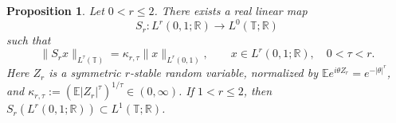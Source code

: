 \documentclass[11pt, reqno]{amsart}
\newtheorem{proposition}[theorem]{Proposition}
\theoremstyle{definition}
\theoremstyle{remark}
\newcommand{\T}{\mathbb{T}}
\newcommand{\R}{\mathbb{R}}
\begin{document}
\begin{proposition}
\label{prop:stable-embed}
Let \(0<r\le2\). There exists a real linear map
\[
        S_r:L^r(0,1;\R)\longrightarrow L^0(\T;\R)
\]
such that
\begin{equation}
\label{eq:stable-moments}
        \|S_rx\|_{L^\tau(\T)}
        =
        \kappa_{r,\tau}\|x\|_{L^r(0,1)},
        \qquad
        x\in L^r(0,1;\R),\quad 0<\tau<r.
\end{equation}
Here \(Z_r\) is a symmetric \(r\)-stable random variable, normalized by
\(\mathbb E e^{i\theta Z_r}=e^{-|\theta|^r}\), and
\(\kappa_{r,\tau}:=(\mathbb E|Z_r|^\tau)^{1/\tau}\in(0,\infty)\).
If \(1<r\le2\), then
\(S_r(L^r(0,1;\R))\subset L^1(\T;\R)\).
\end{proposition}
\end{document}
